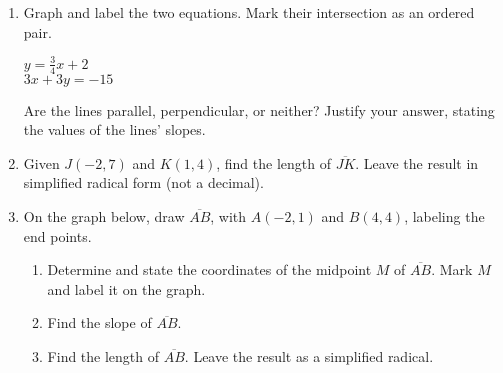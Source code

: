 \documentclass[12pt, twoside]{article}
\begin{document}
\begin{enumerate}
\newpage

  \item Graph and label the two equations. Mark their intersection as an ordered pair.

    \begin{multicols}{2}
      $y = \frac{3}{4}x+2$ \\
      $3x+3y = -15$
    \end{multicols}
    \vspace{1.5cm}

      \begin{center} %
      \end{center}
    Are the lines parallel, perpendicular, or neither? Justify your answer, stating the values of the lines' slopes.


\newpage

  \item Given $J(-2,7)$ and $K(1,4)$, find the length of $\overline{JK}$. Leave the result in simplified radical form (not a decimal).
      \vspace{4cm}

  \item On the graph below, draw $\overline{AB}$, with $A(-2,1)$ and $B(4,4)$, labeling the end points.\\
    \begin{enumerate}
      \item Determine and state the coordinates of the midpoint $M$ of $\overline{AB}$. Mark $M$ and label it on the graph. \vspace{2cm}
      \item Find the slope of $\overline{AB}$. \vspace{2.5cm}
      \item Find the length of $\overline{AB}$. Leave the result as a simplified radical.
    \end{enumerate}


\end{enumerate}
\end{document}
